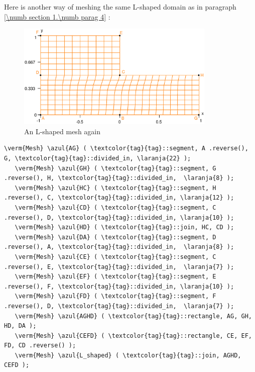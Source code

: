 Here is another way of meshing the same L-shaped domain as in paragraph
\ref{\numb section 1.\numb parag 4} :

\begin{figure}[ht] \centering
  \includegraphics[width=95mm]{L-shaped-distorted}
  \caption{An L-shaped mesh again}
  \label{\numb section 2.\numb fig 1}
\end{figure}

\begin{Verbatim}[commandchars=\\\{\},formatcom=\small\tt,frame=single,
   label=parag-\ref{\numb section 2.\numb parag 1}.cpp,rulecolor=\color{moldura},
   baselinestretch=0.94,framesep=2mm]
   \verm{Mesh} \azul{AG} ( \textcolor{tag}{tag}::segment, A .reverse(), G, \textcolor{tag}{tag}::divided_in, \laranja{22} );
   \verm{Mesh} \azul{GH} ( \textcolor{tag}{tag}::segment, G .reverse(), H, \textcolor{tag}{tag}::divided_in,  \laranja{8} );
   \verm{Mesh} \azul{HC} ( \textcolor{tag}{tag}::segment, H .reverse(), C, \textcolor{tag}{tag}::divided_in, \laranja{12} );
   \verm{Mesh} \azul{CD} ( \textcolor{tag}{tag}::segment, C .reverse(), D, \textcolor{tag}{tag}::divided_in, \laranja{10} );
   \verm{Mesh} \azul{HD} ( \textcolor{tag}{tag}::join, HC, CD );
   \verm{Mesh} \azul{DA} ( \textcolor{tag}{tag}::segment, D .reverse(), A, \textcolor{tag}{tag}::divided_in,  \laranja{8} );
   \verm{Mesh} \azul{CE} ( \textcolor{tag}{tag}::segment, C .reverse(), E, \textcolor{tag}{tag}::divided_in,  \laranja{7} );
   \verm{Mesh} \azul{EF} ( \textcolor{tag}{tag}::segment, E .reverse(), F, \textcolor{tag}{tag}::divided_in, \laranja{10} );
   \verm{Mesh} \azul{FD} ( \textcolor{tag}{tag}::segment, F .reverse(), D, \textcolor{tag}{tag}::divided_in,  \laranja{7} );
   \verm{Mesh} \azul{AGHD} ( \textcolor{tag}{tag}::rectangle, AG, GH, HD, DA );
   \verm{Mesh} \azul{CEFD} ( \textcolor{tag}{tag}::rectangle, CE, EF, FD, CD .reverse() );
   \verm{Mesh} \azul{L_shaped} ( \textcolor{tag}{tag}::join, AGHD, CEFD );
\end{Verbatim}

